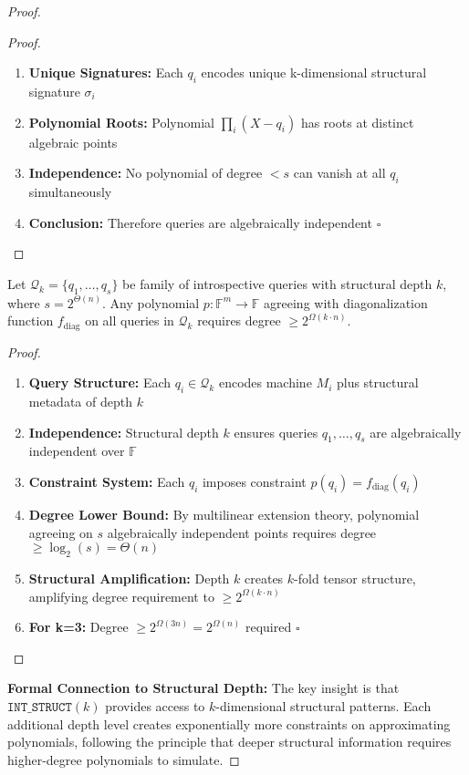 \documentclass[11pt]{article}
\newcommand{\qed}{\hfill$\square$}
\begin{document}
\begin{proof}
\begin{proof}
\begin{enumerate}
\item \textbf{Unique Signatures:} Each $q_i$ encodes unique k-dimensional structural signature $\sigma_i$
\item \textbf{Polynomial Roots:} Polynomial $\prod_{i} (X - q_i)$ has roots at distinct algebraic points
\item \textbf{Independence:} No polynomial of degree $< s$ can vanish at all $q_i$ simultaneously
\item \textbf{Conclusion:} Therefore queries are algebraically independent \qed
\end{enumerate}
\end{proof}

\begin{lemma}
Let $\mathcal{Q}_k = \{q_1, \ldots, q_s\}$ be family of introspective queries with structural depth $k$, where $s = 2^{\Theta(n)}$. Any polynomial $p: \mathbb{F}^m \to \mathbb{F}$ agreeing with diagonalization function $f_{\text{diag}}$ on all queries in $\mathcal{Q}_k$ requires degree $\geq 2^{\Omega(k \cdot n)}$.
\end{lemma}

\begin{proof}
\begin{enumerate}
\item \textbf{Query Structure:} Each $q_i \in \mathcal{Q}_k$ encodes machine $M_i$ plus structural metadata of depth $k$
\item \textbf{Independence:} Structural depth $k$ ensures queries $q_1, \ldots, q_s$ are algebraically independent over $\mathbb{F}$
\item \textbf{Constraint System:} Each $q_i$ imposes constraint $p(q_i) = f_{\text{diag}}(q_i)$
\item \textbf{Degree Lower Bound:} By multilinear extension theory, polynomial agreeing on $s$ algebraically independent points requires degree $\geq \log_2(s) = \Theta(n)$
\item \textbf{Structural Amplification:} Depth $k$ creates $k$-fold tensor structure, amplifying degree requirement to $\geq 2^{\Omega(k \cdot n)}$
\item \textbf{For k=3:} Degree $\geq 2^{\Omega(3n)} = 2^{\Omega(n)}$ required \qed
\end{enumerate}
\end{proof}

\textbf{Formal Connection to Structural Depth:} The key insight is that $\texttt{INT\_STRUCT}(k)$ provides access to $k$-dimensional structural patterns. Each additional depth level creates exponentially more constraints on approximating polynomials, following the principle that deeper structural information requires higher-degree polynomials to simulate.


\end{proof}
\end{document}
